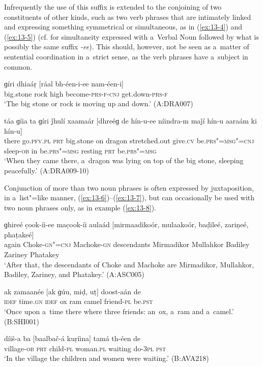 Infrequently the use of this suffix is extended to the conjoining of two constituents of other kinds, such as two verb phrases that are intimately linked and expressing something symmetrical or simultaneous, as in (\ref{ex:13-4}) and (\ref{ex:13-5}) (cf.  for simultaneity expressed with a~Verbal Noun followed by what is possibly the same suffix \textit{-ee}). This should, however, not be seen as a~matter of sentential coordination in a~strict sense, as the verb phrases have a~subject in common.

\begin{exe}
\ex
\label{ex:13-4}
\gll ɡíri dhiaáṛ [ráal bh-éen-i-ee nam-éen-i]  \\
big.stone rock high become-\textsc{prs-f-cnj} get.down-\textsc{prs-f}  \\
\glt `The big stone or rock is moving up and down.' (A:DRA007)

\ex
\label{ex:13-5}
\gll táa ɡíia ta ɡíri ǰhulí xaamaár [dhreéɡ de hín-u-ee níindra-m maǰí hín-u aaraám ki hín-u] \\
there go.\textsc{pfv.pl} \textsc{prt} big.stone on dragon stretched.out  give.\textsc{cv} be.\textsc{prs"=msg"=cnj} sleep-\textsc{ob} in be.\textsc{prs"=msg}  resting \textsc{prt} be.\textsc{prs"=msg}  \\
\glt `When they came there, a~dragon was lying on top of the big stone, sleeping peacefully.' (A:DRA009-10) 
\end{exe}

 Conjunction of more than two noun phrases is often expressed by juxtaposition, in a~list"=like manner, (\ref{ex:13-6})--(\ref{ex:13-7}), but can occasionally be used with two noun phrases only, as in example (\ref{ex:13-8}).

\begin{exe}
\ex
\label{ex:13-6}
\gll ɡhireé c̣ook-íi-ee mac̣ook-íi aulaád [mirmaadikoór, mulaakoór, baḍileé, zariṇeé, phaṭakeé] \\
again Choke-\textsc{gn"=cnj} Machoke-\textsc{gn} descendants  Mirmadikor Mullahkor Badiley Zariney Phatakey \\
\glt `After that, the descendants of Choke and Machoke are Mirmadikor, Mullahkor, Badiley, Zariney, and Phatakey.' (A:ASC005)

\ex
\label{ex:13-7}
\gll ak zamaanée [ak ɡúu, miḍ, uṭ] doost-aán de \\
\textsc{idef} time.\textsc{gn} \textsc{ idef} ox ram camel friend-\textsc{pl}  be.\textsc{pst}  \\
\glt `Once upon a~time there where three friends: an~ox, a~ram and a~camel.' (B:SHI001)

\ex
\label{ex:13-8}
\gll díiš-a ba [baalbač-á kuṛíina] tamá th-éen de \\
village-\textsc{ob} \textsc{prt} child-\textsc{pl} woman.\textsc{pl} waiting do-\textsc{3pl} \textsc{pst}  \\
\glt `In the village the children and women were waiting.' (B:AVA218) 
\end{exe}

